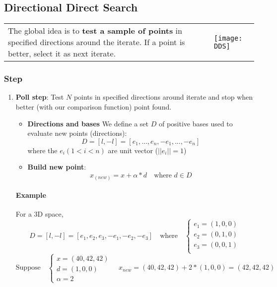 \subsection{Directional Direct Search}

\begin{tabular}{m{12cm}m{3cm}}
The global idea is to \textbf{test a sample of points} in specified
directions around the iterate.
If a point is better, select it as next iterate.
&
\texttt{[image: DDS]}
\end{tabular}

\subsubsection{Step}

\begin{enumerate}
    \item \textbf{Poll step}: Test $N$ points in specified directions
        around iterate and stop when better (with our comparison
        function) point found.

        \begin{itemize}

            \item \textbf{Directions and bases}
                We define a set $D$ of positive bases used to evaluate new
                points (directions):
                $$D = [l, -l] = [e_1,..., e_n, -e_1,..., -e_n]$$
                where the $e_i (1 < i < n)$ are unit vector ($||e_i|| = 1$)

            \item \textbf{Build new point}: 
                $$x_(new) = x+\alpha*d \quad \textrm{where } d \in D$$
        \end{itemize}

        \paragraph{Example} For a 3D space,
        $$D = [l, -l] = [e_1, e_2, e_3, -e_1, -e_2, -e_3] \quad
        \textrm{where} \quad \begin{cases}
            e_1 = (1,0,0) \\
            e_2 = (0,1,0)\\
            e_3 = (0,0,1)\\
        \end{cases} $$
        $$\textrm{Suppose} \quad \begin{cases} 
            x = (40, 42, 42)\\
            d = (1, 0, 0)\\
            \alpha =2
        \end{cases} \quad           
        x_{new}  = (40, 42, 42) + 2 * (1, 0, 0) = (42, 42, 42)$$



\end{enumerate}
